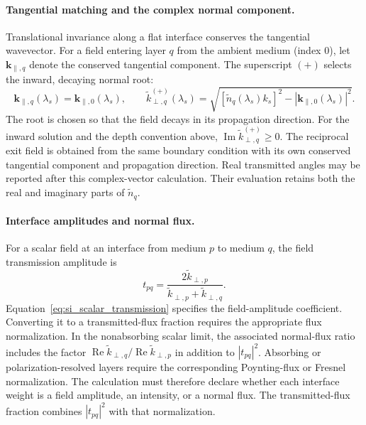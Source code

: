 \paragraph{Tangential matching and the complex normal component.}
Translational invariance along a flat interface conserves the tangential
wavevector. For a field entering layer $q$ from the ambient medium (index $0$), let $\mathbf k_{\parallel,q}$ denote the conserved tangential component. The superscript $(+)$ selects the inward, decaying normal root:
\begin{equation}
  \mathbf k_{\parallel,q}(\lambda_s)
  =\mathbf k_{\parallel,0}(\lambda_s),
  \qquad
  \widetilde k_{\perp,q}^{(+)}(\lambda_s)
  =
  \sqrt{
  \left[\tilde n_q(\lambda_s)k_s\right]^2
  -\left|\mathbf k_{\parallel,0}(\lambda_s)\right|^2}.
  \label{eq:si_boundary_ktz_lambda}
\end{equation}
The root is chosen so that the field decays in its propagation direction. For
the inward solution and the depth convention above,
$\operatorname{Im}\widetilde k_{\perp,q}^{(+)}\geq0$.\cite{Renaud2009} The reciprocal exit
field is obtained from the same boundary condition with its own conserved
tangential component and propagation direction. Real transmitted angles may be reported after this complex-vector calculation. Their evaluation retains both the real and imaginary parts of $\tilde n_q$.

\paragraph{Interface amplitudes and normal flux.}
For a scalar field at an interface from medium $p$ to medium $q$, the field
transmission amplitude is
\begin{equation}
  t_{pq}=\frac{2\widetilde k_{\perp,p}}{\widetilde k_{\perp,p}+\widetilde k_{\perp,q}}.
  \label{eq:si_scalar_transmission}
\end{equation}
Equation~\eqref{eq:si_scalar_transmission} specifies the field-amplitude coefficient. Converting it to a transmitted-flux fraction requires the appropriate flux normalization. In the nonabsorbing scalar limit, the associated
normal-flux ratio includes the factor
$\operatorname{Re}\widetilde k_{\perp,q}/\operatorname{Re}\widetilde k_{\perp,p}$ in addition to
$|t_{pq}|^2$. Absorbing or polarization-resolved layers require the
corresponding Poynting-flux or Fresnel normalization. The calculation must
therefore declare whether each interface weight is a field amplitude, an
intensity, or a normal flux. The transmitted-flux fraction combines $|t_{pq}|^2$ with that normalization.

